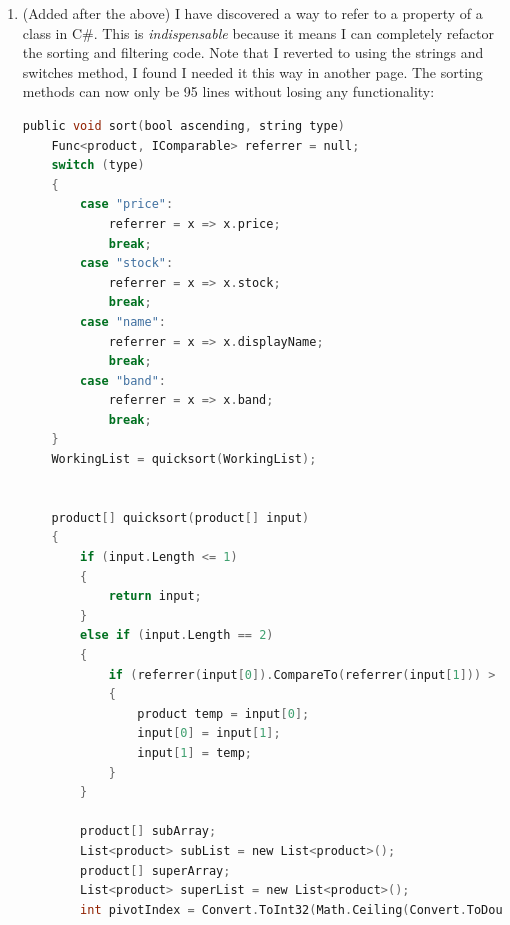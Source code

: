 ﻿\documentclass{article}
\begin{document}
\begin{enumerate}
\begin{lstlisting}[language=C]
                {
                    if (WorkingList[i].band.ToUpper() != value.ToUpper())
                    {
                        filteredList.Add(WorkingList[i]);
                        filteredIndex++;
                    }
                }
                break;
            case filterType.type:
                if (whitelist)
                {
                    if (WorkingList[i].type.ToUpper() == value.ToUpper())
                    {
                        filteredList.Add(WorkingList[i]);
                        filteredIndex++;
                    }
                }
                else
                {
                    if (WorkingList[i].type.ToUpper() != value.ToUpper())
                    {
                        filteredList.Add(WorkingList[i]);
                        filteredIndex++;
                    }
                }
                break;
        }
    }
    WorkingList = filteredList.ToArray();
}
        \end{lstlisting}
        \item (Added after the above) I have discovered a way to refer to a property of a class in C\#.
        This is \textit{indispensable} because it means I can completely refactor the sorting and filtering code.
        Note that I reverted to using the strings and switches method, I found I needed it this way in another page.
        The sorting methods can now only be 95 lines without losing any functionality:
        \begin{lstlisting}[language=C]
public void sort(bool ascending, string type)
    Func<product, IComparable> referrer = null;
    switch (type)
    {
        case "price":
            referrer = x => x.price;
            break;
        case "stock":
            referrer = x => x.stock;
            break;
        case "name":
            referrer = x => x.displayName;
            break;
        case "band":
            referrer = x => x.band;
            break;
    }
    WorkingList = quicksort(WorkingList);


    product[] quicksort(product[] input)
    {
        if (input.Length <= 1)
        {
            return input;
        }
        else if (input.Length == 2)
        {
            if (referrer(input[0]).CompareTo(referrer(input[1])) > 0 && ascending || (referrer(input[0]).CompareTo(referrer(input[1])) < 0) && !ascending)
            {
                product temp = input[0];
                input[0] = input[1];
                input[1] = temp;
            }
        }

        product[] subArray;
        List<product> subList = new List<product>();
        product[] superArray;
        List<product> superList = new List<product>();
        int pivotIndex = Convert.ToInt32(Math.Ceiling(Convert.ToDouble(input.Length) / 2)) - 1;


\end{lstlisting}
\end{enumerate}
\end{document}
